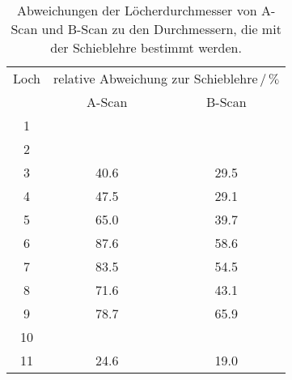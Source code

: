 \begin{table}
  \centering
  \begin{tabular}{c|cc}
    \toprule
    \multicolumn{1}{c|}{Loch} & \multicolumn{2}{c}{relative Abweichung zur Schieblehre$\,/\,\%$}\\
    & {A-Scan} & {B-Scan} \\
  \midrule
  1  &  \hrulefill  & \hrulefill  \\
  2  &  \hrulefill  & \hrulefill  \\
  3  &  40.6        & 29.5  \\
  4  &  47.5        & 29.1  \\
  5  &  65.0        & 39.7  \\
  6  &  87.6        & 58.6  \\
  7  &  83.5        & 54.5  \\
  8  &  71.6        & 43.1  \\
  9  &  78.7        & 65.9  \\
  10 &  \hrulefill  & \hrulefill  \\
  11 &  24.6        & 19.0  \\
  \bottomrule
  \end{tabular}
  \caption{Abweichungen der Löcherdurchmesser von A-Scan und B-Scan zu den Durchmessern, die mit der Schieblehre bestimmt werden.}
  \label{tab:abweichung}
\end{table}
